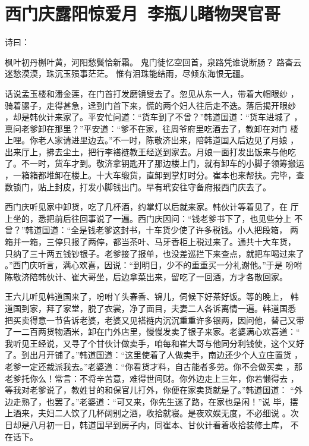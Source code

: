 \chapter{西门庆露阳惊爱月~李瓶儿睹物哭官哥}

诗曰：

枫叶初丹槲叶黄，河阳愁鬓恰新霜。
鬼门徒忆空回首，泉路凭谁说断肠？
路杳云迷愁漠漠，珠沉玉殒事茫茫。
惟有泪珠能结雨，尽倾东海恨无疆。

话说孟玉楼和潘金莲，在门首打发磨镜叟去了。忽见从东一人，带着大帽眼纱
，骑着骡子，走得甚急，迳到门首下来，慌的两个妇人往后走不迭。落后揭开眼纱
，却是韩伙计来家了。平安忙问道：“货车到了不曾？”韩道国道：“货车进城了
，禀问老爹卸在那里？”平安道：“爹不在家，往周爷府里吃酒去了，教卸在对门
楼上哩。你老人家请进里边去。”不一时，陈敬济出来，陪韩道国入后边见了月娘
，出来厅上，拂去尘土，把行李褡裢教王经送到家去。月娘一面打发出饭来与他吃
了。不一时，货车才到。敬济拿钥匙开了那边楼上门，就有卸车的小脚子领筹搬运
，一箱箱都堆卸在楼上。十大车缎货，直卸到掌灯时分。崔本也来帮扶。完毕，查
数锁门，贴上封皮，打发小脚钱出门。早有玳安往守备府报西门庆去了。

西门庆听见家中卸货，吃了几杯酒，约掌灯以后就来家。韩伙计等着见了，在
厅上坐的，悉把前后往回事说了一遍。西门庆因问：“钱老爹书下了，也见些分上
不曾？”韩道国道：“全是钱老爹这封书，十车货少使了许多税钱。小人把段箱，
两箱并一箱，三停只报了两停，都当茶叶、马牙香柜上税过来了。通共十大车货，
只纳了三十两五钱钞银子。老爹接了报单，也没差巡拦下来查点，就把车喝过来了
。”西门庆听言，满心欢喜，因说：“到明日，少不的重重买一分礼谢他。”于是
吩咐陈敬济陪韩伙计、崔大哥坐，后边拿菜出来，留吃了一回酒，方才各散回家。

王六儿听见韩道国来了，吩咐丫头春香、锦儿，伺候下好茶好饭。等的晚上，
韩道国到家，拜了家堂，脱了衣裳，净了面目，夫妻二人各诉离情一遍。韩道国悉
把买卖得意一节告诉老婆，老婆又见褡裢内沉沉重重许多银两，因问他，替己又带
了一二百两货物酒米，卸在门外店里，慢慢发卖了银子来家。老婆满心欢喜道：“
我听见王经说，又寻了个甘伙计做卖手，咱每和崔大哥与他同分利钱使，这个又好
了。到出月开铺了。”韩道国道：“这里使着了人做卖手，南边还少个人立庄置货
，老爹一定还裁派我去。”老婆道：“你看货才料，自古能者多劳。你不会做买卖
，那老爹托你么！常言：不将辛苦意，难得世间财。你外边走上三年，你若懒得去
，等我对老爹说了，教姓甘的和保官儿打外，你便在家卖货就是了。”韩道国道：
“外边走熟了，也罢了。”老婆道：“可又来，你先生迷了路，在家也是闲！”说
毕，摆上酒来，夫妇二人饮了几杯阔别之酒，收拾就寝。是夜欢娱无度，不必细说
。次日却是八月初一日，韩道国早到房子内，同崔本、甘伙计看着收拾装修土库，
不在话下。

